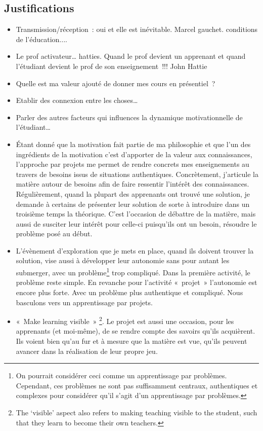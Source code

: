 \subsection{Justifications}
\begin{itemize}
    \item Transmission/réception~: oui et elle est inévitable. Marcel gauchet. conditions de l'éducation....
    \item Le prof activateur… hatties. Quand le prof devient un apprenant et quand l'étudiant devient le prof de son enseignement~!!! John Hattie
    \item Quelle est ma valeur ajouté de donner mes cours en présentiel~?
    \item Etablir des connexion entre les choses…
    \item Parler des autres facteurs qui influences la dynamique motivationnelle de l'étudiant…
    \item Étant donné que la motivation fait partie de ma philosophie et que l’un des ingrédients de la motivation c’est d’apporter de la valeur aux connaissances\cite{viau1994motivation}, l’approche par projets me permet de rendre concrets mes enseignements au travers de besoins issus de situations authentiques. Concrètement, j'articule la matière autour de besoins afin de faire ressentir l'intérêt des connaissances. Régulièrement, quand la plupart des apprenants ont trouvé une solution, je demande à certains de présenter leur solution de sorte à introduire dans un troisième temps la théorique.  C’est l’occasion de débattre de la matière, mais aussi de susciter leur intérêt pour celle-ci puisqu’ils ont un besoin, résoudre le problème posé au début.
    \item L'évènement d'exploration que je mets en place, quand ils doivent trouver la solution, vise aussi à développer leur autonomie sans pour autant les submerger, avec un problème\footnote{On pourrait considérer ceci comme un apprentissage par problèmes. Cependant, ces problèmes ne sont pas suffisamment centraux, authentiques et complexes pour considérer qu’il s’agit d’un apprentissage par problèmes.} trop compliqué. Dans la première activité, le problème reste simple. En revanche pour l'activité «~projet~» l’autonomie est encore plus forte. Avec un problème plus authentique et compliqué. Nous basculons vers un apprentissage par projets.
    \item «~Make learning visible~» \footnote{The ‘visible’ aspect also refers to making teaching visible to the student, such that they learn to become their own teachers.}\cite{hattie2012visible}. Le projet est aussi une occasion, pour les apprenants (et moi-même), de se rendre compte des savoirs qu'ils acquièrent. Ils voient bien qu'au fur et à mesure que la matière est vue, qu’ils peuvent avancer dans la réalisation de leur propre jeu.

\end{itemize}
